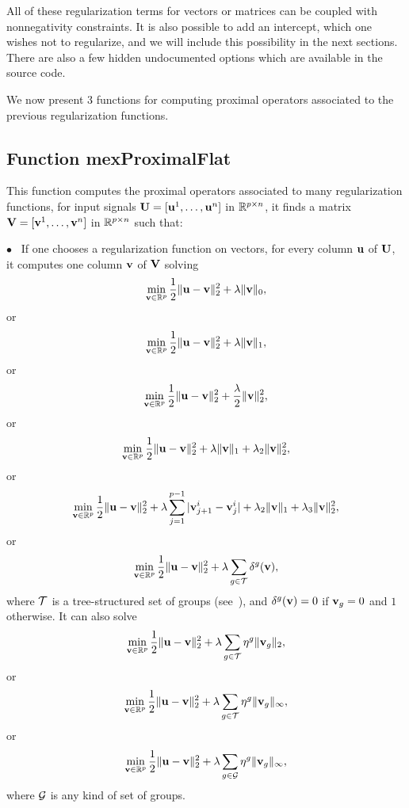 \documentclass[a4paper, 11pt]{article}
\begin{document}
All of these regularization terms for vectors or matrices can be coupled with
nonnegativity constraints.  It is also possible to add an intercept, which one
wishes not to regularize, and we will include this possibility in the next
sections. There are also a few hidden undocumented options which are available in the source code.

We now present 3 functions for computing proximal operators associated to the previous regularization functions.
\subsection{Function mexProximalFlat}
This function computes the proximal operators associated to many regularization functions, for input signals ${\mathbf U}=[{\mathbf u}^1,\ldots,{\mathbf u}^n]$ in ${\mathbb R}^{p \times n}$, it finds a matrix ${\mathbf V}=[{\mathbf v}^1,\ldots,{\mathbf v}^n]$ in ${\mathbb R}^{p \times n}$ such that:

$\bullet$~ If one chooses a regularization function on vectors, for every column ${\mathbf u}$ of ${\mathbf U}$, it computes one column ${\mathbf v}$ of ${\mathbf V}$ solving
\begin{equation}
\min_{{\mathbf v} \in {\mathbb R}^p} \frac{1}{2}\|{\mathbf u}-{\mathbf v}\|_2^2 + \lambda \|{\mathbf v}\|_0,
\end{equation}
or
\begin{equation}
\min_{{\mathbf v} \in {\mathbb R}^p} \frac{1}{2}\|{\mathbf u}-{\mathbf v}\|_2^2 + \lambda \|{\mathbf v}\|_1,
\end{equation}
or
\begin{equation}
\min_{{\mathbf v} \in {\mathbb R}^p} \frac{1}{2}\|{\mathbf u}-{\mathbf v}\|_2^2 + \frac{\lambda}{2} \|{\mathbf v}\|_2^2,
\end{equation}
or
\begin{equation}
\min_{{\mathbf v} \in {\mathbb R}^p} \frac{1}{2}\|{\mathbf u}-{\mathbf v}\|_2^2 + \lambda \|{\mathbf v}\|_1 + \lambda_2\|{\mathbf v}\|_2^2,
\end{equation}
or
\begin{equation}
\min_{{\mathbf v} \in {\mathbb R}^p} \frac{1}{2}\|{\mathbf u}-{\mathbf v}\|_2^2 + \lambda\sum_{j=1}^{p-1}|{\mathbf v}_{j+1}^i-{\mathbf v}_j^i|+\lambda_2 \|{\mathbf v}\|_1 + \lambda_3\|{\mathbf v}\|_2^2,
\end{equation}
or
\begin{equation}
\min_{{\mathbf v} \in {\mathbb R}^p} \frac{1}{2}\|{\mathbf u}-{\mathbf v}\|_2^2 + \lambda \sum_{g \in {\mathcal T}} \delta^g({\mathbf v}),
\end{equation}
where ${\mathcal T}$ is a tree-structured set of groups (see~\cite{jenatton4}), and $\delta^g({\mathbf v}) = 0$ if ${\mathbf v}_g=0$ and $1$ otherwise.
It can also solve
\begin{equation}
\min_{{\mathbf v} \in {\mathbb R}^p} \frac{1}{2}\|{\mathbf u}-{\mathbf v}\|_2^2 + \lambda \sum_{g \in {\mathcal T}} \eta^g \|{\mathbf v}_g\|_2,
\end{equation}
or
\begin{equation}
\min_{{\mathbf v} \in {\mathbb R}^p} \frac{1}{2}\|{\mathbf u}-{\mathbf v}\|_2^2 + \lambda \sum_{g \in {\mathcal T}} \eta^g \|{\mathbf v}_g\|_\infty,
\end{equation}
or
\begin{equation}
\min_{{\mathbf v} \in {\mathbb R}^p} \frac{1}{2}\|{\mathbf u}-{\mathbf v}\|_2^2 + \lambda \sum_{g \in {\mathcal G}} \eta^g \|{\mathbf v}_g\|_\infty,
\end{equation}
where ${\mathcal G}$ is any kind of set of groups.
\end{document}
